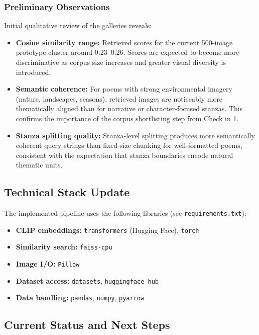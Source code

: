 \documentclass[11pt,a4paper]{article}
\begin{document}
\subsubsection*{Preliminary Observations}

Initial qualitative review of the galleries reveals:
\begin{itemize}
  \item \textbf{Cosine similarity range:} Retrieved scores for the current 500-image prototype cluster around 0.23--0.26. Scores are expected to become more discriminative as corpus size increases and greater visual diversity is introduced.
  \item \textbf{Semantic coherence:} For poems with strong environmental imagery (nature, landscapes, seasons), retrieved images are noticeably more thematically aligned than for narrative or character-focused stanzas. This confirms the importance of the corpus shortlisting step from Check in 1.
  \item \textbf{Stanza splitting quality:} Stanza-level splitting produces more semantically coherent query strings than fixed-size chunking for well-formatted poems, consistent with the expectation that stanza boundaries encode natural thematic units.
\end{itemize}

\subsection*{Technical Stack Update}

The implemented pipeline uses the following libraries (see \texttt{requirements.txt}):
\begin{itemize}
  \item \textbf{CLIP embeddings:} \texttt{transformers} (Hugging Face), \texttt{torch}
  \item \textbf{Similarity search:} \texttt{faiss-cpu}
  \item \textbf{Image I/O:} \texttt{Pillow}
  \item \textbf{Dataset access:} \texttt{datasets}, \texttt{huggingface-hub}
  \item \textbf{Data handling:} \texttt{pandas}, \texttt{numpy}, \texttt{pyarrow}
\end{itemize}

\subsection*{Current Status and Next Steps}
\end{document}
